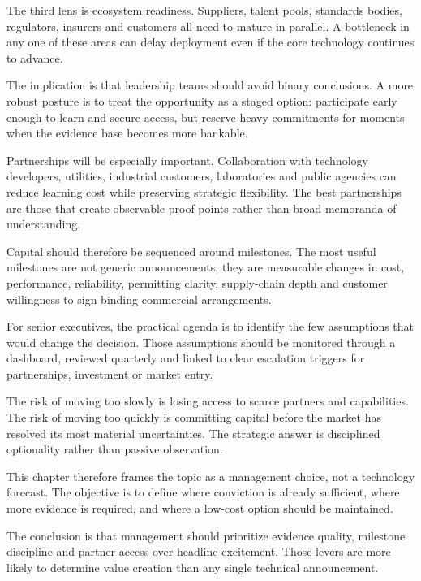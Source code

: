 \documentclass[10pt,a4paper]{article}
\begin{document}
{\small The third lens is ecosystem readiness. Suppliers, talent pools, standards bodies, regulators, insurers and customers all need to mature in parallel. A bottleneck in any one of these areas can delay deployment even if the core technology continues to advance.}\par
{\small The implication is that leadership teams should avoid binary conclusions. A more robust posture is to treat the opportunity as a staged option: participate early enough to learn and secure access, but reserve heavy commitments for moments when the evidence base becomes more bankable.}\par
{\small Partnerships will be especially important. Collaboration with technology developers, utilities, industrial customers, laboratories and public agencies can reduce learning cost while preserving strategic flexibility. The best partnerships are those that create observable proof points rather than broad memoranda of understanding.}\par
{\small Capital should therefore be sequenced around milestones. The most useful milestones are not generic announcements; they are measurable changes in cost, performance, reliability, permitting clarity, supply-chain depth and customer willingness to sign binding commercial arrangements.}\par
{\small For senior executives, the practical agenda is to identify the few assumptions that would change the decision. Those assumptions should be monitored through a dashboard, reviewed quarterly and linked to clear escalation triggers for partnerships, investment or market entry.}\par
{\small The risk of moving too slowly is losing access to scarce partners and capabilities. The risk of moving too quickly is committing capital before the market has resolved its most material uncertainties. The strategic answer is disciplined optionality rather than passive observation.}\par
{\small This chapter therefore frames the topic as a management choice, not a technology forecast. The objective is to define where conviction is already sufficient, where more evidence is required, and where a low-cost option should be maintained.}\par
{\small The conclusion is that management should prioritize evidence quality, milestone discipline and partner access over headline excitement. Those levers are more likely to determine value creation than any single technical announcement.}\par
\label{chap:4:end}
\end{document}
